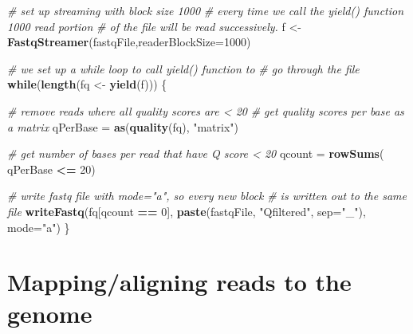 \documentclass[12pt,]{krantz}
\newenvironment{Shaded}{\begin{snugshade}}{\end{snugshade}}
\newcommand{\CommentTok}[1]{\textcolor[rgb]{0.56,0.35,0.01}{\textit{#1}}}
\newcommand{\ControlFlowTok}[1]{\textcolor[rgb]{0.13,0.29,0.53}{\textbf{#1}}}
\newcommand{\DataTypeTok}[1]{\textcolor[rgb]{0.13,0.29,0.53}{#1}}
\newcommand{\DecValTok}[1]{\textcolor[rgb]{0.00,0.00,0.81}{#1}}
\newcommand{\KeywordTok}[1]{\textcolor[rgb]{0.13,0.29,0.53}{\textbf{#1}}}
\newcommand{\NormalTok}[1]{#1}
\newcommand{\OperatorTok}[1]{\textcolor[rgb]{0.81,0.36,0.00}{\textbf{#1}}}
\newcommand{\StringTok}[1]{\textcolor[rgb]{0.31,0.60,0.02}{#1}}
\begin{document}
\begin{Shaded}
\begin{Highlighting}[]
\CommentTok{# set up streaming with block size 1000}
\CommentTok{# every time we call the yield() function 1000 read portion}
\CommentTok{# of the file will be read successively. }
\NormalTok{f <-}\StringTok{ }\KeywordTok{FastqStreamer}\NormalTok{(fastqFile,}\DataTypeTok{readerBlockSize=}\DecValTok{1000}\NormalTok{) }

\CommentTok{# we set up a while loop to call yield() function to}
\CommentTok{# go through the file}
\ControlFlowTok{while}\NormalTok{(}\KeywordTok{length}\NormalTok{(fq <-}\StringTok{ }\KeywordTok{yield}\NormalTok{(f))) \{}
  
    \CommentTok{# remove reads where all quality scores are < 20 }
    \CommentTok{# get quality scores per base as a matrix}
\NormalTok{    qPerBase =}\StringTok{ }\KeywordTok{as}\NormalTok{(}\KeywordTok{quality}\NormalTok{(fq), }\StringTok{"matrix"}\NormalTok{)}

    \CommentTok{# get number of bases per read that have Q score < 20}
\NormalTok{    qcount =}\StringTok{ }\KeywordTok{rowSums}\NormalTok{( qPerBase }\OperatorTok{<=}\StringTok{ }\DecValTok{20}\NormalTok{) }
 
    \CommentTok{# write fastq file with mode="a", so every new block}
    \CommentTok{# is written out to the same file}
    \KeywordTok{writeFastq}\NormalTok{(fq[qcount }\OperatorTok{==}\StringTok{ }\DecValTok{0}\NormalTok{], }
               \KeywordTok{paste}\NormalTok{(fastqFile, }\StringTok{"Qfiltered"}\NormalTok{, }\DataTypeTok{sep=}\StringTok{"_"}\NormalTok{), }
               \DataTypeTok{mode=}\StringTok{"a"}\NormalTok{)}
\NormalTok{\}}
\end{Highlighting}
\end{Shaded}

\hypertarget{mappingaligning-reads-to-the-genome}{%
\section{Mapping/aligning reads to the genome}\label{mappingaligning-reads-to-the-genome}}
\end{document}
